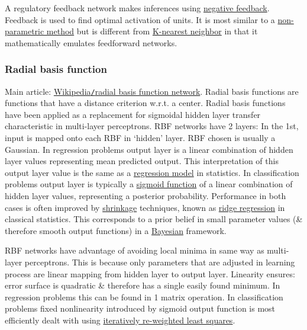 \documentclass{article}
\begin{document}
A regulatory feedback network makes inferences using \href{https://en.wikipedia.org/wiki/Negative_feedback}{negative feedback}. Feedback is used to find optimal activation of units. It is most similar to a \href{https://en.wikipedia.org/wiki/Non-parametric_methods}{non-parametric method} but is different from \href{https://en.wikipedia.org/wiki/K-nearest_neighbor}{K-nearest neighbor} in that it mathematically emulates feedforward networks.

\subsubsection{Radial basis function}
Main article: \href{https://en.wikipedia.org/wiki/Radial_basis_function_network}{Wikipedia{\tt/}radial basis function network}. Radial basis functions are functions that have a distance criterion w.r.t. a center. Radial basis functions have been applied as a replacement for sigmoidal hidden layer transfer characteristic in multi-layer perceptrons. RBF networks have 2 layers: In the 1st, input is mapped onto each RBF in `hidden' layer. RBF chosen is usually a Gaussian. In regression problems output layer is a linear combination of hidden layer values representing mean predicted output. This interpretation of this output layer value is the same as a \href{https://en.wikipedia.org/wiki/Regression_analysis}{regression model} in statistics. In classification problems output layer is typically a \href{https://en.wikipedia.org/wiki/Sigmoid_function}{sigmoid function} of a linear combination of hidden layer values, representing a posterior probability. Performance in both cases is often improved by \href{https://en.wikipedia.org/wiki/Shrinkage_(statistics)}{shrinkage} techniques, known as \href{https://en.wikipedia.org/wiki/Ridge_regression}{ridge regression} in classical statistics. This corresponds to a prior belief in small parameter values (\& therefore smooth output functions) in a \href{https://en.wikipedia.org/wiki/Bayesian_statistics}{Bayesian} framework.

RBF networks have advantage of avoiding local minima in same way as multi-layer perceptrons. This is because only parameters that are adjusted in learning process are linear mapping from hidden layer to output layer. Linearity ensures: error surface is quadratic \& therefore has a single easily found minimum. In regression problems this can be found in 1 matrix operation. In classification problems fixed nonlinearity introduced by sigmoid output function is most efficiently dealt with using \href{https://en.wikipedia.org/wiki/Iteratively_re-weighted_least_squares}{iteratively re-weighted least squares}.
\end{document}
